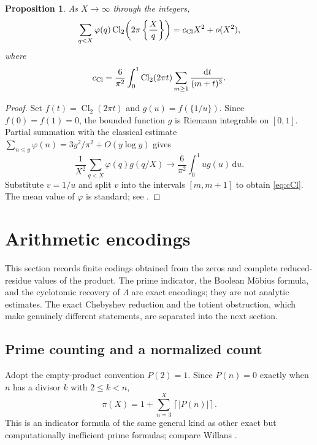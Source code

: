\documentclass[11pt]{amsart}
\numberwithin{equation}{section}
\newtheorem{proposition}[theorem]{Proposition}
\theoremstyle{definition}
\theoremstyle{remark}
\newcommand{\dd}{\,\mathrm d}
\begin{document}
\begin{proposition}\label{prop:Clausen-main}
As \(X\to\infty\) through the integers,
\begin{equation}\label{eq:Clausen-main}
 \sum_{q<X}\varphi(q)
 \operatorname{Cl}_2\!\left(2\pi\left\{\frac Xq\right\}\right)
 =c_{\rm Cl}X^2+o(X^2),
\end{equation}
where
\begin{equation}\label{eq:cCl}
 c_{\rm Cl}=\frac6{\pi^2}\int_0^1
 \operatorname{Cl}_2(2\pi t)
 \sum_{m\geq1}\frac{\dd t}{(m+t)^3}.
\end{equation}
\end{proposition}

\begin{proof}
Set \(f(t)=\operatorname{Cl}_2(2\pi t)\) and
\(g(u)=f(\{1/u\})\).  Since \(f(0)=f(1)=0\), the bounded function \(g\)
is Riemann integrable on \([0,1]\).  Partial summation with the classical
estimate
\(\sum_{n\leq y}\varphi(n)=3y^2/\pi^2+O(y\log y)\) gives
\[
 \frac1{X^2}\sum_{q<X}\varphi(q)g(q/X)
 \longrightarrow\frac6{\pi^2}\int_0^1ug(u)\dd u.
\]
Substitute \(v=1/u\) and split \(v\) into the intervals
\([m,m+1]\) to obtain \eqref{eq:cCl}.  The mean value of \(\varphi\) is
standard; see \cite[Chapter~3]{Apostol1976}.
\end{proof}

\section{Arithmetic encodings}
\label{sec:recoveries}

This section records finite codings obtained from the zeros and complete
reduced-residue values of the product.  The prime indicator, the Boolean
M\"obius formula, and the cyclotomic recovery of \(\Lambda\) are exact
encodings; they are not analytic estimates.  The exact Chebyshev reduction
and the totient obstruction, which make genuinely different statements, are
separated into the next section.

\subsection{Prime counting and a normalized count}

Adopt the empty-product convention \(P(2)=1\).  Since \(P(n)=0\) exactly
when \(n\) has a divisor \(k\) with \(2\leq k<n\),
\begin{equation}\label{eq:prime-count}
 \pi(X)=1+\sum_{n=3}^{X}\left\lceil|P(n)|\right\rceil.
\end{equation}
This is an indicator formula of the same general kind as other exact but
computationally inefficient prime formulas; compare Willans
\cite{Willans1964}.
\end{document}
